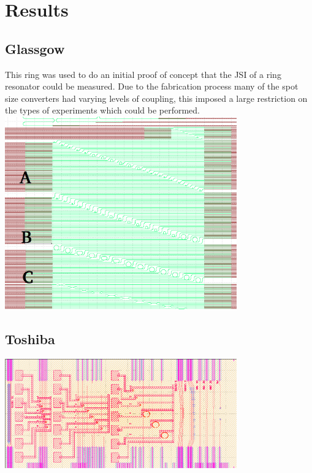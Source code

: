 \newpage
\section{Results}
\subsection{Glassgow}
This ring was used to do an initial proof of concept that the JSI of a ring resonator could be measured. Due to the fabrication process many of the spot size converters had varying levels of coupling, this imposed a large restriction on the types of experiments which could be performed.
\begingroup
    \centering  
    \includegraphics[width=10cm]{img/results/glassgowChipNumbering.png}
     \vspace{3pt} \label{crossCompare}
\endgroup
\subsection{Toshiba}
\begingroup
    \centering  
    \includegraphics[width=10cm]{img/results/toshiba.png}
     \vspace{3pt} \label{crossCompare}
\endgroup
